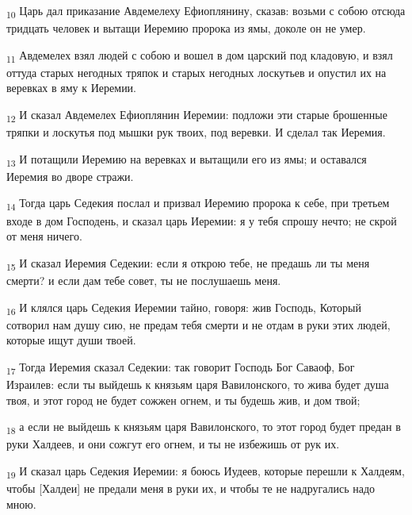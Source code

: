 \begin{tcolorbox}
\textsubscript{10} Царь дал приказание Авдемелеху Ефиоплянину, сказав: возьми с собою отсюда тридцать человек и вытащи Иеремию пророка из ямы, доколе он не умер.
\end{tcolorbox}
\begin{tcolorbox}
\textsubscript{11} Авдемелех взял людей с собою и вошел в дом царский под кладовую, и взял оттуда старых негодных тряпок и старых негодных лоскутьев и опустил их на веревках в яму к Иеремии.
\end{tcolorbox}
\begin{tcolorbox}
\textsubscript{12} И сказал Авдемелех Ефиоплянин Иеремии: подложи эти старые брошенные тряпки и лоскутья под мышки рук твоих, под веревки. И сделал так Иеремия.
\end{tcolorbox}
\begin{tcolorbox}
\textsubscript{13} И потащили Иеремию на веревках и вытащили его из ямы; и оставался Иеремия во дворе стражи.
\end{tcolorbox}
\begin{tcolorbox}
\textsubscript{14} Тогда царь Седекия послал и призвал Иеремию пророка к себе, при третьем входе в дом Господень, и сказал царь Иеремии: я у тебя спрошу нечто; не скрой от меня ничего.
\end{tcolorbox}
\begin{tcolorbox}
\textsubscript{15} И сказал Иеремия Седекии: если я открою тебе, не предашь ли ты меня смерти? и если дам тебе совет, ты не послушаешь меня.
\end{tcolorbox}
\begin{tcolorbox}
\textsubscript{16} И клялся царь Седекия Иеремии тайно, говоря: жив Господь, Который сотворил нам душу сию, не предам тебя смерти и не отдам в руки этих людей, которые ищут души твоей.
\end{tcolorbox}
\begin{tcolorbox}
\textsubscript{17} Тогда Иеремия сказал Седекии: так говорит Господь Бог Саваоф, Бог Израилев: если ты выйдешь к князьям царя Вавилонского, то жива будет душа твоя, и этот город не будет сожжен огнем, и ты будешь жив, и дом твой;
\end{tcolorbox}
\begin{tcolorbox}
\textsubscript{18} а если не выйдешь к князьям царя Вавилонского, то этот город будет предан в руки Халдеев, и они сожгут его огнем, и ты не избежишь от рук их.
\end{tcolorbox}
\begin{tcolorbox}
\textsubscript{19} И сказал царь Седекия Иеремии: я боюсь Иудеев, которые перешли к Халдеям, чтобы [Халдеи] не предали меня в руки их, и чтобы те не надругались надо мною.
\end{tcolorbox}
